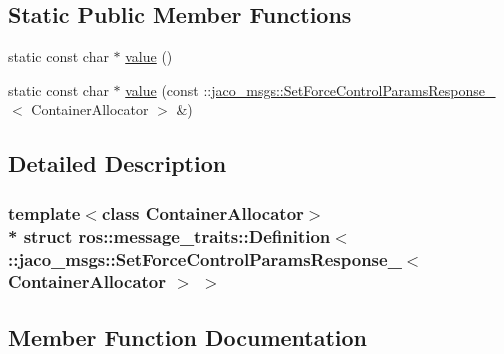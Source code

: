 \subsection*{Static Public Member Functions}
\begin{DoxyCompactItemize}
\item 
static const char $\ast$ \hyperlink{structros_1_1message__traits_1_1Definition_3_01_1_1jaco__msgs_1_1SetForceControlParamsResponse__095d983db8d83707a3d1e1cd70107388_ab13e9ce671a89590e2580932b979a965}{value} ()
\item 
static const char $\ast$ \hyperlink{structros_1_1message__traits_1_1Definition_3_01_1_1jaco__msgs_1_1SetForceControlParamsResponse__095d983db8d83707a3d1e1cd70107388_acef056e60ac576504de6447fc9a76d2e}{value} (const \+::\hyperlink{structjaco__msgs_1_1SetForceControlParamsResponse__}{jaco\+\_\+msgs\+::\+Set\+Force\+Control\+Params\+Response\+\_\+}$<$ Container\+Allocator $>$ \&)
\end{DoxyCompactItemize}


\subsection{Detailed Description}
\subsubsection*{template$<$class Container\+Allocator$>$\\*
struct ros\+::message\+\_\+traits\+::\+Definition$<$ \+::jaco\+\_\+msgs\+::\+Set\+Force\+Control\+Params\+Response\+\_\+$<$ Container\+Allocator $>$ $>$}



\subsection{Member Function Documentation}
